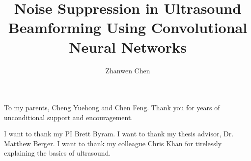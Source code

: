 \documentclass{ucbthesis}
\begin{document}

\title{Noise Suppression in Ultrasound Beamforming Using Convolutional Neural Networks}
\author{Zhanwen Chen}




\maketitle
\approvalpage
\copyrightpage



\begin{frontmatter}

\begin{dedication}
\null\vfil
\begin{center}
  To my parents, Cheng Yuehong and Chen Feng. Thank you for years of unconditional support and encouragement.
\end{center}
\vfil\null
\end{dedication}

\tableofcontents
\clearpage
\listoffigures
\clearpage
\listoftables

\begin{acknowledgements}
  I want to thank my PI Brett Byram.
  I want to thank my thesis advisor, Dr. Matthew Berger.
  I want to thank my colleague Chris Khan for tirelessly explaining the basics of ultrasound.
\end{acknowledgements}

\end{frontmatter}

\pagestyle{headings}







\printbibliography
\end{document}
